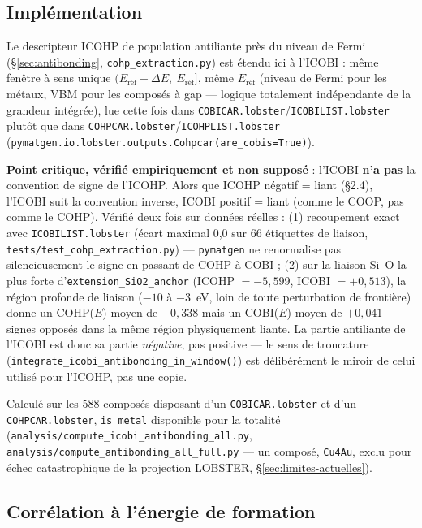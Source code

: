 \documentclass[11pt,a4paper]{article}
\begin{document}
\subsection{Implémentation}

Le descripteur ICOHP de population antiliante près du niveau de Fermi
(\S\ref{sec:antibonding}, \texttt{cohp\_extraction.py}) est étendu ici à
l'ICOBI : même fenêtre à sens unique
$(E_\text{réf}-\Delta E,\ E_\text{réf}]$, même $E_\text{réf}$ (niveau de
Fermi pour les métaux, VBM pour les composés à gap --- logique
totalement indépendante de la grandeur intégrée), lue cette fois dans
\texttt{COBICAR.lobster}/\texttt{ICOBILIST.lobster} plutôt que dans
\texttt{COHPCAR.lobster}/\texttt{ICOHPLIST.lobster}
(\texttt{pymatgen.io.lobster.outputs.Cohpcar(are\_cobis=True)}).

\textbf{Point critique, vérifié empiriquement et non supposé} : l'ICOBI
\textbf{n'a pas} la convention de signe de l'ICOHP. Alors que
\og{}ICOHP négatif = liant\fg{} (\S2.4), l'ICOBI suit la convention
inverse, \og{}ICOBI positif = liant\fg{} (comme le COOP, pas comme le
COHP). Vérifié deux fois sur données réelles : (1) recoupement exact
avec \texttt{ICOBILIST.lobster} (écart maximal 0,0 sur 66 étiquettes de
liaison, \texttt{tests/test\_cohp\_extraction.py}) --- \texttt{pymatgen}
ne renormalise pas silencieusement le signe en passant de COHP à COBI ;
(2) sur la liaison Si--O la plus forte d'\texttt{extension\_SiO2\_anchor}
(ICOHP $=-5{,}599$, ICOBI $=+0{,}513$), la région profonde de liaison
($-10$ à $-3$~eV, loin de toute perturbation de frontière) donne un COHP($E$)
moyen de $-0{,}338$ mais un COBI($E$) moyen de $+0{,}041$ --- signes
opposés dans la même région physiquement liante. La partie antiliante de
l'ICOBI est donc sa partie \emph{négative}, pas positive --- le sens de
troncature (\texttt{integrate\_icobi\_antibonding\_in\_window()}) est
délibérément le miroir de celui utilisé pour l'ICOHP, pas une copie.

Calculé sur les 588 composés disposant d'un \texttt{COBICAR.lobster} et
d'un \texttt{COHPCAR.lobster}, \texttt{is\_metal} disponible pour la
totalité (\texttt{analysis/compute\_icobi\_antibonding\_all.py},
\texttt{analysis/compute\_antibonding\_all\_full.py} --- un composé,
\texttt{Cu4Au}, exclu pour échec catastrophique de la projection LOBSTER,
\S\ref{sec:limites-actuelles}).

\subsection{Corrélation à l'énergie de formation}
\end{document}
